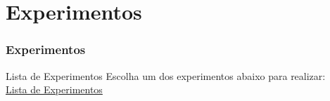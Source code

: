 \documentclass[
	10pt, %
	t, %
]{beamer}
\begin{document}


\section{Experimentos}

\begin{frame}
	\frametitle{Experimentos}


	\begin{exampleblock}{Lista de Experimentos}
		Escolha um dos experimentos abaixo para realizar:\\
		\href{https://gist.github.com/fabricioifc/e620122192af1abca4fe22e6fdd9bce3}{\faLink \hspace{0.2em} Lista de Experimentos}
	\end{exampleblock}
	



\end{frame}

	


		
		
		

\end{document}
